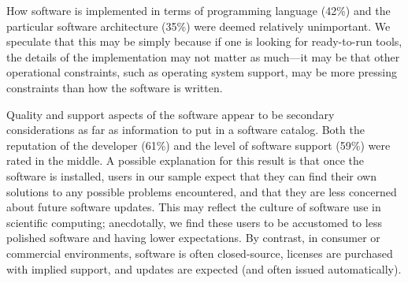 \documentclass[review]{elsarticle}
\begin{document}
How software is implemented in terms of programming language (42\%) and the particular software architecture (35\%) were deemed relatively unimportant.  We speculate that this may be simply because if one is looking for ready-to-run tools, the details of the implementation may not matter as much---it may be that other operational constraints, such as operating system support, may be more pressing constraints than how the software is written.

Quality and support aspects of the software appear to be secondary considerations as far as information to put in a software catalog.  Both the reputation of the developer (61\%) and the level of software support (59\%) were rated in the middle.  A possible explanation for this result is that once the software is installed, users in our sample expect that they can find their own solutions to any possible problems encountered, and that they are less concerned about future software updates. This may reflect the culture of software use in scientific computing; anecdotally, we find these users to be accustomed to less polished software and having lower expectations.  By contrast, in consumer or commercial environments, software is often closed-source, licenses are purchased with implied support, and updates are expected (and often issued automatically).



\end{document}
